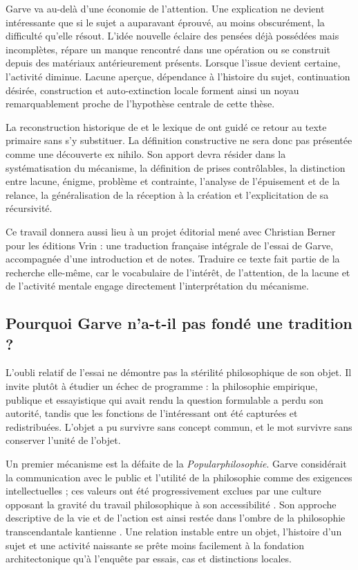 \documentclass[11pt,a4paper]{article}
\begin{document}
Garve va au-delà d'une économie de l'attention. Une explication ne devient
intéressante que si le sujet a auparavant éprouvé, au moins obscurément, la
difficulté qu'elle résout. L'idée nouvelle éclaire des pensées déjà possédées
mais incomplètes, répare un manque rencontré dans une opération ou se construit
depuis des matériaux antérieurement présents. Lorsque l'issue devient certaine,
l'activité diminue. Lacune aperçue, dépendance à l'histoire du sujet,
continuation désirée, construction et auto-extinction locale forment ainsi un
noyau remarquablement proche de l'hypothèse centrale de cette thèse.

La reconstruction historique de \textcite{nannini2018garve} et le lexique de
\textcite{nannini2018interesting} ont guidé ce retour au texte primaire sans s'y
substituer. La définition constructive ne sera donc pas présentée comme une
découverte ex nihilo. Son apport devra résider dans la systématisation du
mécanisme, la définition de prises contrôlables, la distinction entre lacune,
énigme, problème et contrainte, l'analyse de l'épuisement et de la relance, la
généralisation de la réception à la création et l'explicitation de sa
récursivité.

Ce travail donnera aussi lieu à un projet éditorial mené avec Christian Berner
pour les éditions Vrin : une traduction française intégrale de l'essai de
Garve, accompagnée d'une introduction et de notes. Traduire ce texte fait partie
de la recherche elle-même, car le vocabulaire de l'intérêt, de l'attention, de
la lacune et de l'activité mentale engage directement l'interprétation du
mécanisme.

\subsection{Pourquoi Garve n'a-t-il pas fondé une tradition ?}

L'oubli relatif de l'essai ne démontre pas la stérilité philosophique de son
objet. Il invite plutôt à étudier un échec de programme : la philosophie
empirique, publique et essayistique qui avait rendu la question formulable a
perdu son autorité, tandis que les fonctions de l'intéressant ont été capturées
et redistribuées. L'objet a pu survivre sans concept commun, et le mot survivre
sans conserver l'unité de l'objet.

Un premier mécanisme est la défaite de la \emph{Popularphilosophie}. Garve
considérait la communication avec le public et l'utilité de la philosophie comme
des exigences intellectuelles ; ces valeurs ont été progressivement exclues par
une culture opposant la gravité du travail philosophique à son accessibilité
\parencite{thompson2018garve}. Son approche descriptive de la vie et de l'action
est ainsi restée dans l'ombre de la philosophie transcendantale kantienne
\parencite{bachmannmedick2008anziehungskraft}. Une relation instable entre un
objet, l'histoire d'un sujet et une activité naissante se prête moins facilement
à la fondation architectonique qu'à l'enquête par essais, cas et distinctions
locales.
\end{document}
